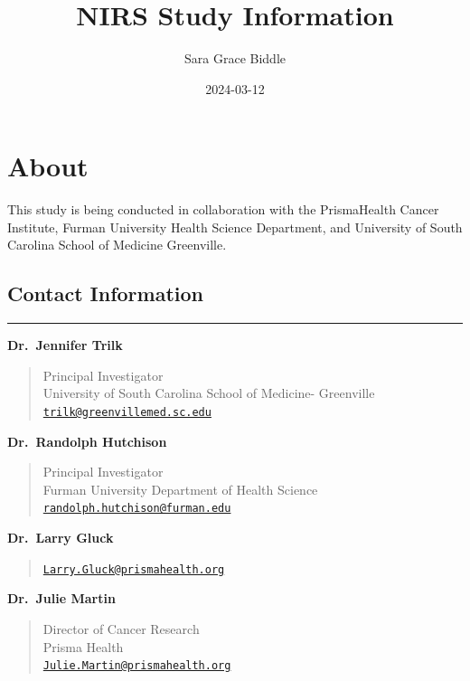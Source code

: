 \documentclass[
]{book}
\title{NIRS Study Information}
\author{Sara Grace Biddle}
\date{2024-03-12}
\begin{document}
\maketitle

{
\setcounter{tocdepth}{1}
\tableofcontents
}
\hypertarget{about}{%
\chapter{About}\label{about}}

This study is being conducted in collaboration with the PrismaHealth Cancer Institute, Furman University Health Science Department, and University of South Carolina School of Medicine Greenville.

\hypertarget{contact-information}{%
\section{Contact Information}\label{contact-information}}

\begin{center}\rule{0.5\linewidth}{0.5pt}\end{center}

\textbf{Dr.~Jennifer Trilk}

\begin{quote}
Principal Investigator\\
University of South Carolina School of Medicine- Greenville\\
\href{mailto:trilk@greenvillemed.sc.edu}{\nolinkurl{trilk@greenvillemed.sc.edu}}
\end{quote}

\textbf{Dr.~Randolph Hutchison}

\begin{quote}
Principal Investigator\\
Furman University Department of Health Science\\
\href{mailto:randolph.hutchison@furman.edu}{\nolinkurl{randolph.hutchison@furman.edu}}
\end{quote}

\textbf{Dr.~Larry Gluck}

\begin{quote}
\href{mailto:Larry.Gluck@prismahealth.org}{\nolinkurl{Larry.Gluck@prismahealth.org}}
\end{quote}

\textbf{Dr.~Julie Martin}

\begin{quote}
Director of Cancer Research\\
Prisma Health\\
\href{mailto:Julie.Martin@prismahealth.org}{\nolinkurl{Julie.Martin@prismahealth.org}}
\end{quote}
\end{document}
